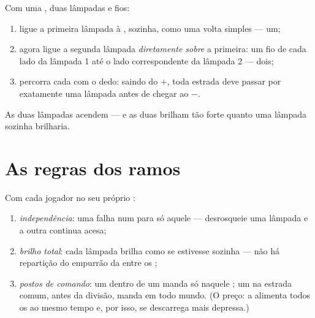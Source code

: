 \begin{method}\label{met:g5:series-parallel-circuits:build}
Com uma , duas lâmpadas e fios:
\begin{enumerate}
  \item ligue a primeira lâmpada à , sozinha, como uma volta
        simples ---  um;
  \item agora ligue a segunda lâmpada \emph{diretamente sobre} a
        primeira: um fio de cada lado da lâmpada 1 até o lado
        correspondente da lâmpada 2 ---  dois;
  \item percorra cada  com o dedo: saindo do $+$, toda estrada
        deve passar por exatamente uma lâmpada antes de chegar ao
        $-$.
\end{enumerate}
As duas lâmpadas acendem --- e as duas brilham tão forte quanto uma
lâmpada sozinha brilharia.
\end{method}

\section{As regras dos ramos}

\begin{proposition}\label{prop:g5:series-parallel-circuits:rules}
Com cada jogador no seu próprio :
\begin{enumerate}
  \item \emph{independência}: uma falha num  para só aquele 
        --- desrosqueie uma lâmpada e a outra continua acesa;
  \item \emph{brilho total}: cada lâmpada brilha como se estivesse
        sozinha --- não há repartição do empurrão da  entre os
        ;
  \item \emph{postos de comando}: um  dentro de um 
        manda só naquele ; um  na estrada comum, antes
        da divisão, manda em todo mundo. (O preço: a  alimenta
        todos os  ao mesmo tempo e, por isso, se descarrega mais
        depressa.)
\end{enumerate}
\end{proposition}

